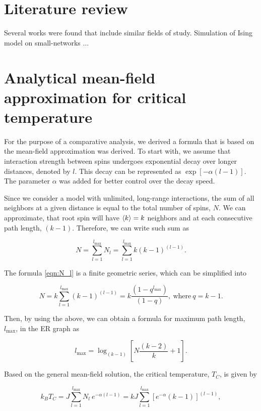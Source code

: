 \documentclass[11pt,a4paper]{article}
\begin{document}
\section{Literature review}

Several works were found that include similar fields of study. 
Simulation of Ising model on small-networks ...

\section{Analytical mean-field approximation for critical temperature}

For the purpose of a comparative analysis, we derived a formula that is based on the mean-field approximation was derived. To start with, we assume that interaction strength between spins undergoes exponential decay over longer distances, denoted by $l$. This decay can be represented as $\exp[-\alpha (l-1)]$. The parameter $\alpha$ was added for better control over the decay speed.

Since we consider a model with unlimited, long-range interactions, the sum of all neighbors at a given distance is equal to the total number of spins, $N$. We can approximate, that root spin will have $\braket{k}=k$ neighbors and at each consecutive path length, $(k-1)$. Therefore, we can write such sum as

\begin{equation}\label{eqn:N_l}
    N = \sum_{l=1}^{l_{\max}} N_l = \sum_{l=1}^{l_{\max}} k (k-1)^{(l-1)}.
\end{equation}

The formula \eqref{eqn:N_l} is a finite geometric series, which can be simplified into

\begin{equation}\label{eqn:geom_series}
    N = k \sum_{l=1}^{l_{\max}} (k-1)^{(l-1)} = k\frac{(1 - q^{l_{\max}})}{(1 - q)},\ \text{where}\ q=k-1.
\end{equation}

Then, by using the above, we can obtain a formula for maximum path length, $l_{\max}$, in the ER graph as

\begin{equation}\label{eqn:l_max}
    l_{\max} = \log_{(k-1)}{\left[N\frac{(k-2)}{k} + 1\right]}.
\end{equation}

Based on the general mean-field solution, the critical temperature, $T_C$, is given by

\begin{equation}\label{eqn:base_tc}
    k_B T_C = J \sum_{l=1}^{l_{\max}} N_l~ e^{-\alpha (l-1)} = kJ \sum_{l=1}^{l_{\max}} \left[e^{-\alpha}(k-1)\right]^{(l-1)},
\end{equation}
\end{document}
